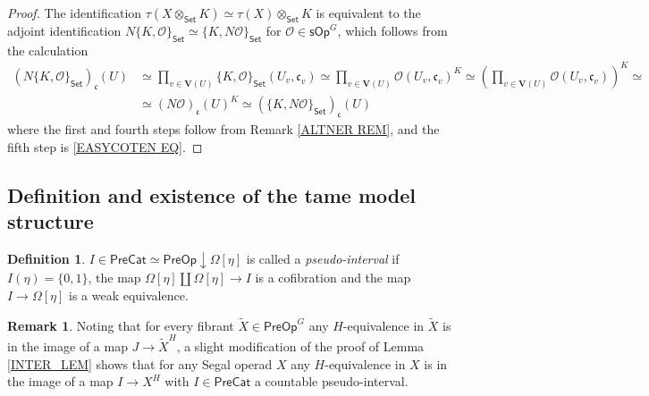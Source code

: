 \documentclass[a4paper,10pt
,draft
]{article}%
\numberwithin{equation}{section}
\numberwithin{figure}{section}
\theoremstyle{definition} %
\newtheorem{definition}[equation]{Definition}%
\newtheorem{remark}[equation]{Remark}%
\renewcommand{\O}{\ensuremath{\mathcal O}}
\newcommand{\1}{\ensuremath{\mathbbm 1}}%
\begin{document}
\begin{proof}
	The identification
	$\tau(X \otimes_{\mathsf{Set}} K) \simeq \tau(X) \otimes_{\mathsf{Set}} K$
	is equivalent to the adjoint identification
	$
	N \{K,\O\}_{\mathsf{Set}}
	\simeq
	\{K,N \O\}_{\mathsf{Set}} 
	$
	for $\O \in \mathsf{sOp}^G$,
	which follows from the calculation
	\begin{equation}
	\begin{split}
	\left(N \{K,\O\}_{\mathsf{Set}}\right)_{\mathfrak{c}}(U)
	& \simeq
	\prod_{v \in \boldsymbol{V}(U)} 
	\{K,\O\}_{\mathsf{Set}}(U_v,\mathfrak{c}_v)
	\simeq
	\prod_{v \in \boldsymbol{V}(U)}
	\O(U_v,\mathfrak{c}_v)^K
	\simeq
	\left(\prod_{v \in \boldsymbol{V}(U)}
	\O(U_v,\mathfrak{c}_v)\right)^K
	\simeq 
	\\
	& \simeq
	\left(N \O\right)_{\mathfrak{c}}(U)^K
	\simeq
	\left(\{K,N \O\}_{\mathsf{Set}}\right)_{\mathfrak{c}}(U)
	\end{split}
	\end{equation}
	where the first and fourth steps follow from Remark \ref{ALTNER REM},
	and the fifth step is \eqref{EASYCOTEN EQ}.
\end{proof}




\subsection{Definition and existence of the tame model structure}



\begin{definition}
	$I \in \mathsf{PreCat}\simeq \mathsf{PreOp} \downarrow \Omega[\eta]$ 
	is called a \emph{pseudo-interval}
	if $I(\eta) = \{0,1\}$,
	the map 
	$\Omega[\eta] \amalg \Omega[\eta] \to I$
	is a cofibration and the map
	$I \to \Omega[\eta]$
	is a weak equivalence.
\end{definition}



\begin{remark}\label{SLIMOD REM}
	Noting that for every fibrant 
	$\tilde{X} \in \mathsf{PreOp}^G$
	any $H$-equivalence in $\tilde{X}$ is in the image of a map
	$J \to \tilde{X}^H$, 
	a slight modification of the proof of Lemma \ref{INTER_LEM}
	shows that for any Segal operad $X$
	any $H$-equivalence in $X$ is in the image of a map
	$I \to X^H$
	with $I \in \mathsf{PreCat}$ a countable pseudo-interval.
\end{remark}
\end{document}
